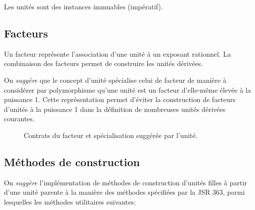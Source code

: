 \documentclass[a4paper,twoside,10pt]{article}
\begin{document}
Les unités sont des instances immuables (impératif).

\subsection{Facteurs}

Un facteur représente l'association d'une unité à un exposant rationnel. La combinaison des facteurs permet de
construire les unités dérivées.

On \emph{suggère} que le concept d'unité spécialise celui de facteur de manière à considérer par polymorphisme qu'une
unité est un facteur d'elle-même élevée à la puissance 1. Cette représentation permet d'éviter la construction de
facteurs d'unités à la puissance 1 dans la définition de nombreuses unités dérivées courantes.


\begin{figure}[!h]
\caption{Contrats du facteur et spécialisation suggérée par l'unité.}
\end{figure}

\subsection{Méthodes de construction}

On \emph{suggère} l'implémentation de méthodes de construction d'unités filles à partir d'une unité parente à la manière
des méthodes spécifiées par la JSR 363, parmi lesquelles les méthodes utilitaires suivantes:
\end{document}
